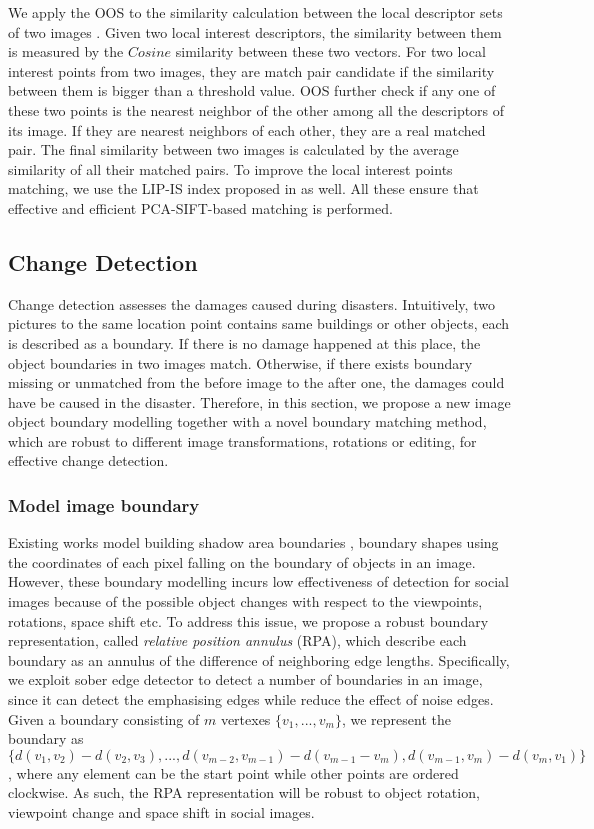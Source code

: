 \documentclass[runningheads,a4paper]{llncs}
\begin{document}
We apply the OOS to the similarity calculation between the local descriptor sets of two images \cite{DBLP:journals/tmm/ZhaoNTW07}. 
Given two local interest descriptors, the similarity between them is measured by the $Cosine$ similarity between these two vectors. For two local interest points from two images, they are match pair candidate if the similarity between them is bigger than a threshold value. OOS further check if any one of these two points is the nearest neighbor of the other among all the descriptors of its image. If they are nearest neighbors of each other, they are a real matched pair. The final similarity between two images is calculated by the average similarity of all their matched pairs. To improve the local interest points matching, we use the LIP-IS index proposed in \cite{DBLP:journals/tmm/ZhaoNTW07} as well. All these ensure that effective and efficient PCA-SIFT-based matching is performed.

\subsection{Change Detection}
Change detection assesses the damages caused during disasters. Intuitively, two pictures to the same location point contains same buildings or other objects, each is described as a boundary. 
If there is no damage happened at this place, the object boundaries in two images match. 
Otherwise, if there exists boundary missing or unmatched from the before image to the after one, the damages could have be caused in the disaster. Therefore, in this section, we propose a new image object boundary modelling together with a novel boundary matching method, which are robust to different image transformations, rotations or editing, for effective change detection.

\subsubsection{Model image boundary}

Existing works model building shadow area boundaries \cite{turker2008building}, boundary shapes \cite{rs2051217} using the coordinates of each pixel falling on the boundary of objects in an image. 
However, these boundary modelling incurs low effectiveness of detection for social images because of the possible object changes with respect to the viewpoints, rotations, space shift etc. 
To address this issue, we propose a robust boundary representation, called \emph{relative position annulus} (RPA), 
which describe each boundary as an annulus of the difference of neighboring edge lengths. 
Specifically, we exploit sober edge detector to detect a number of boundaries in an image, 
since it can detect the emphasising edges while reduce the effect of noise edges. Given a boundary consisting of $m$ vertexes $\{v_1,...,v_m\}$, we represent the boundary as $\{d(v_1,v_2)-d(v_2,v_3),...,d(v_{m-2},v_{m-1})-d(v_{m-1}-v_m), d(v_{m-1},v_m)-d(v_m,v_1)\}$, where any element can be the start point while other points are ordered clockwise. As such, the RPA representation will be robust to object rotation, viewpoint change and space shift in social images.
\end{document}
